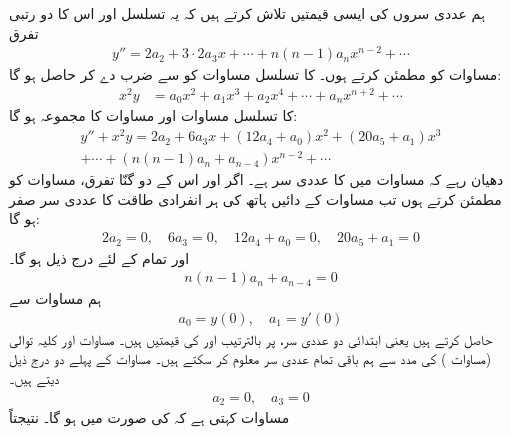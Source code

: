ہم عددی سروں   کی ایسی قیمتیں تلاش کرتے ہیں کہ یہ تسلسل اور اس کا دو رتبی تفرق
\begin{align}\label{مساوات_تسلسل_ابتدائی_قیمت_تسلسل_حل_پ}
y''=2a_2+3\cdot 2a_3x+\cdots+n(n-1)a_nx^{n-2}+\cdots
\end{align}
مساوات  کو مطمئن کرتے ہوں۔  کا تسلسل مساوات  کو  سے ضرب دے کر حاصل ہو گا:
\begin{align}\label{مساوات_تسلسل_ابتدائی_قیمت_تسلسل_حل_ت}
x^2y&=a_0x^2+a_1x^3+a_2x^4+\cdots+a_nx^{n+2}+\cdots
\end{align}
 کا تسلسل  مساوات  اور مساوات  کا مجموعہ ہو گا:
\begin{multline}\label{مساوات_تسلسل_ابتدائی_قیمت_تسلسل_حل_ٹ}
y''+x^2y=2a_2+6a_3x+(12a_4+a_0)x^2+(20a_5+a_1)x^3\\
+\cdots+(n(n-1)a_n+a_{n-4})x^{n-2}+\cdots
\end{multline}
دھیان رہے کہ مساوات  میں  کا عددی سر  ہے۔ اگر  اور اس کے دو گنّا تفرق،  مساوات  کو مطمئن کرتے ہوں تب مساوات  کے دائیں ہاتھ   کی ہر انفرادی طاقت کا عددی سر صفر ہو گا:
\begin{align}\label{مساوات_تسلسل_ابتدائی_قیمت_تسلسل_حل_ث}
2a_2=0,\quad 6a_3=0,\quad 12a_4+a_0=0,\quad 20a_5+a_1=0
\end{align}
اور تمام  کے لئے درج ذیل ہو گا۔
\begin{align}\label{مساوات_تسلسل_ابتدائی_قیمت_تسلسل_حل_ج}
n(n-1)a_n+a_{n-4}=0
\end{align}
ہم مساوات  سے
\begin{align*}
a_0=y(0),\quad a_1=y'(0)
\end{align*}
حاصل کرتے ہیں یعنی ابتدائی دو عددی سر،  پر بالترتیب  اور  کی قیمتیں ہیں۔ مساوات  اور کلیہ توالی (مساوات )  کی مدد سے ہم باقی تمام عددی سر معلوم کر سکتے ہیں۔ مساوات  کے پہلے دو درج ذیل دیتے ہیں۔
\begin{align*}
a_2=0,\quad a_3=0
\end{align*}
مساوات  کہتی ہے کہ  کی صورت میں  ہو گا۔ نتیجتاً
